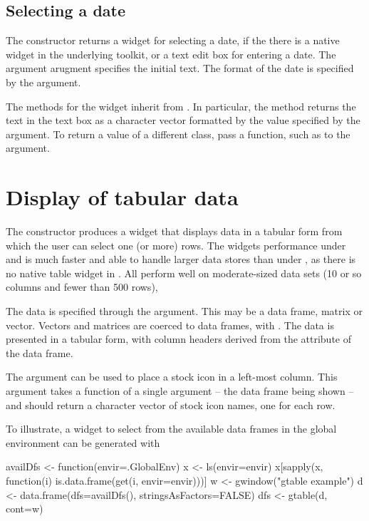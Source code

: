 \subsection{Selecting a date}
\label{sec:gWidgets-selecting-date}

The  constructor returns a widget for selecting
a date, if the there is a native widget in the underlying toolkit,
or a text edit box for entering a date. The argument
 arugment specifies the initial
text. The format of the date is specified by the
 argument.

The methods for the widget inherit from . In particular,
the  method returns the text in the text box
as a character vector formatted by the value specified by the
 argument. To return a value of a
different class, pass a function, such as  to the
 argument.




\section{Display of tabular data}
\label{sec:gWidgets-tabular-data-display}


The  constructor produces a widget that displays
data in a tabular form from which the user can select one (or more)
rows. The widgets performance under  and
 is much faster and able to handle larger data stores
than under , as there is no native table widget in
\tcltk. All perform well on moderate-sized data sets (10 or so columns
and fewer than 500 rows),

The data is specified through the 
argument. This may be a data frame, matrix or vector. Vectors and
matrices are coerced to data frames, with
.  The data is presented in a tabular
form, with column headers derived from the  attribute of
the data frame.

The  argument
can be used to place a stock icon in a left-most column.  This argument
takes a function of a single argument -- the data frame being shown --
and should return a character vector of stock icon names, one for each
row.

To illustrate, a widget to select from the available data frames in
the global environment can be generated with
\begin{Schunk}
\begin{Sinput}
 availDfs <- function(envir=.GlobalEnv) {
   x <- ls(envir=envir)
   x[sapply(x, function(i) is.data.frame(get(i, envir=envir)))]
 }
 w <- gwindow("gtable example")
 d <- data.frame(dfs=availDfs(), stringsAsFactors=FALSE)
 dfs <- gtable(d, cont=w)
\end{Sinput}
\end{Schunk}


